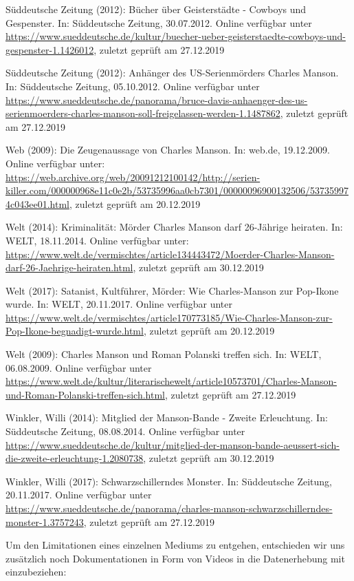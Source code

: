 \documentclass[
]{article}
\begin{document}
Süddeutsche Zeitung (2012): Bücher über Geisterstädte - Cowboys und
Gespenster. In: Süddeutsche Zeitung, 30.07.2012. Online verfügbar unter
\url{https://www.sueddeutsche.de/kultur/buecher-ueber-geisterstaedte-cowboys-und-gespenster-1.1426012},
zuletzt geprüft am 27.12.2019

Süddeutsche Zeitung (2012): Anhänger des US-Serienmörders Charles
Manson. In: Süddeutsche Zeitung, 05.10.2012. Online verfügbar unter
\url{https://www.sueddeutsche.de/panorama/bruce-davis-anhaenger-des-us-serienmoerders-charles-manson-soll-freigelassen-werden-1.1487862},
zuletzt geprüft am 27.12.2019

Web (2009): Die Zeugenaussage von Charles Manson. In: web.de,
19.12.2009. Online verfügbar unter:
\url{https://web.archive.org/web/20091212100142/http://serien-killer.com/000000968e11c0e2b/53735996aa0cb7301/00000096900132506/537359974c043ee01.html},
zuletzt geprüft am 20.12.2019

Welt (2014): Kriminalität: Mörder Charles Manson darf 26-Jährige
heiraten. In: WELT, 18.11.2014. Online verfügbar unter:
\url{https://www.welt.de/vermischtes/article134443472/Moerder-Charles-Manson-darf-26-Jaehrige-heiraten.html},
zuletzt geprüft am 30.12.2019

Welt (2017): Satanist, Kultführer, Mörder: Wie Charles-Manson zur
Pop-Ikone wurde. In: WELT, 20.11.2017. Online verfügbar unter
\url{https://www.welt.de/vermischtes/article170773185/Wie-Charles-Manson-zur-Pop-Ikone-begnadigt-wurde.html},
zuletzt geprüft am 20.12.2019

Welt (2009): Charles Manson und Roman Polanski treffen sich. In: WELT,
06.08.2009. Online verfügbar unter
\url{https://www.welt.de/kultur/literarischewelt/article10573701/Charles-Manson-und-Roman-Polanski-treffen-sich.html},
zuletzt geprüft am 27.12.2019

Winkler, Willi (2014): Mitglied der Manson-Bande - Zweite Erleuchtung.
In: Süddeutsche Zeitung, 08.08.2014. Online verfügbar unter
\url{https://www.sueddeutsche.de/kultur/mitglied-der-manson-bande-aeussert-sich-die-zweite-erleuchtung-1.2080738},
zuletzt geprüft am 30.12.2019

Winkler, Willi (2017): Schwarzschillerndes Monster. In: Süddeutsche
Zeitung, 20.11.2017. Online verfügbar unter
\url{https://www.sueddeutsche.de/panorama/charles-manson-schwarzschillerndes-monster-1.3757243},
zuletzt geprüft am 27.12.2019

Um den Limitationen eines einzelnen Mediums zu entgehen, entschieden wir
uns zusätzlich noch Dokumentationen in Form von Videos in die
Datenerhebung mit einzubeziehen:
\end{document}
